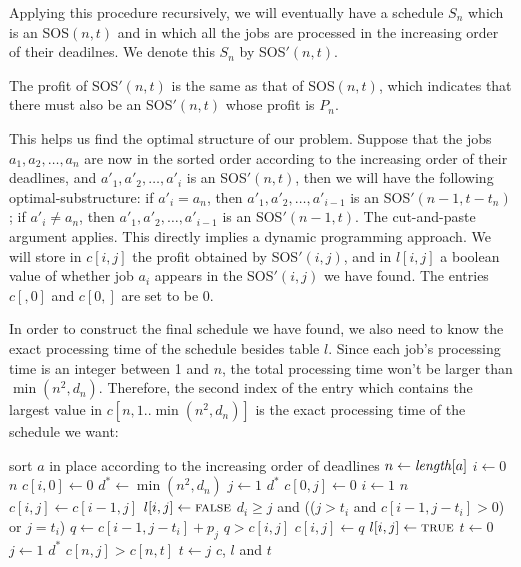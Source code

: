 \documentclass[a4paper, fleqn]{article}
\begin{document}
Applying this procedure recursively, we will eventually have a
schedule $S_n$ which is an SOS$(n,t)$ and in which all the jobs
are processed in the increasing order of their deadilnes. We denote
this $S_n$ by SOS$'(n,t)$.

The profit of SOS$'(n,t)$ is the same as that of SOS$(n,t)$, which
indicates that there must also be an SOS$'(n,t)$ whose profit is
$P_n$.

This helps us find the optimal structure of our problem. Suppose that
the jobs $a_1, a_2, \ldots, a_n$ are now in the sorted order according
to the increasing order of their deadlines, and $a'_1, a'_2, \ldots,
a'_i$ is an SOS$'(n,t)$, then we will have the following
optimal-substructure: if $a'_i = a_n$, then $a'_1, a'_2, \ldots,
a'_{i-1}$ is an SOS$'(n - 1, t - t_n)$; if $a'_i \neq a_n$, then
$a'_1, a'_2, \ldots, a'_{i-1}$ is an SOS$'(n - 1, t)$. The
cut-and-paste argument applies. This directly implies a dynamic
programming approach. We will store in $c[i,j]$ the profit obtained by
SOS$'(i,j)$, and in $l[i,j]$ a boolean value of whether job $a_i$
appears in the SOS$'(i,j)$ we have found. The entries $c[,0]$ and
$c[0,]$ are set to be 0.

In order to construct the final schedule we have found, we also need
to know the exact processing time of the schedule besides table $l$.
Since each job's processing time is an integer between 1 and $n$, the
total processing time won't be larger than $\min(n^2, d_n)$.
Therefore, the second index of the entry which contains the largest
value in $c[n,1..\min(n^2, d_n)]$ is the exact processing time of the
schedule we want:

\begin{codebox}
\li sort $a$ in place according to the increasing order of deadlines
\li $n \gets \id{length}[a]$
\li \For $i \gets 0$ \To $n$
\li   \Do
        $c[i,0] \gets 0$
      \End
\li $d^* \gets \min(n^2, d_n)$
\li \For $j \gets 1$ \To $d^*$
\li   \Do
        $c[0,j] \gets 0$
\li     \For $i \gets 1$ \To $n$
\li       \Do
            $c[i,j] \gets c[i-1,j]$
\li         $l[i,j] \gets \textnormal{\scshape false}$
\li         \If $d_i \geq j$ and
                (($j > t_i$ and $c[i-1,j - t_i] > 0$) or $j = t_i$)
\li           \Then
                $q \gets c[i-1, j - t_i] + p_j$
\li             \If $q > c[i,j]$
\li               \Then
                    $c[i,j] \gets q$
\li                 $l[i,j] \gets \textnormal{\scshape true}$
                  \End  %
              \End  %
          \End  %
      \End  %
\li $t \gets 0$
\li \For $j \gets 1$ \To $d^*$
\li   \Do
        \If $c[n,j] > c[n,t]$
\li       \Then
            $t \gets j$
          \End
      \End
\li \Return $c$, $l$ and $t$
\end{codebox}
\end{document}
